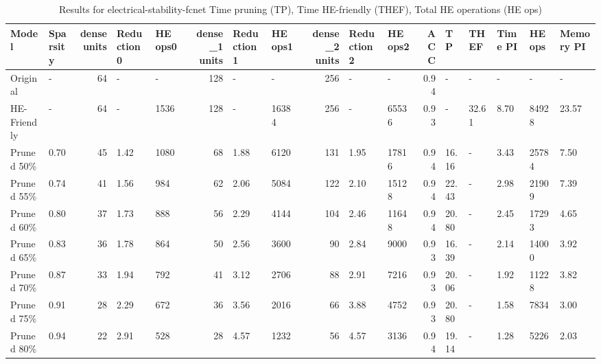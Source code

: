 \begin{table}
\centering
\caption{Results for electrical-stability-fcnet  Time pruning (TP), Time HE-friendly (THEF), Total HE operations (HE ops)}
\begin{tabular}{llrllrllrllrlllll}
\toprule
      Model & Sparsity &  dense units & Reduction0 & HE ops0 &  dense\_1 units & Reduction1 & HE ops1 &  dense\_2 units & Reduction2 & HE ops2 &  ACC &    TP &  THEF & Time PI & HE ops & Memory PI \\
\midrule
   Original &        - &           64 &          - &       - &            128 &          - &       - &            256 &          - &       - & 0.94 &     - &     - &       - &      - &         - \\
HE-Friendly &        - &           64 &          - &    1536 &            128 &          - &   16384 &            256 &          - &   65536 & 0.93 &     - & 32.61 &    8.70 &  84928 &     23.57 \\
 Pruned 50\% &     0.70 &           45 &       1.42 &    1080 &             68 &       1.88 &    6120 &            131 &       1.95 &   17816 & 0.94 & 16.16 &     - &    3.43 &  25784 &      7.50 \\
 Pruned 55\% &     0.74 &           41 &       1.56 &     984 &             62 &       2.06 &    5084 &            122 &       2.10 &   15128 & 0.94 & 22.43 &     - &    2.98 &  21909 &      7.39 \\
 Pruned 60\% &     0.80 &           37 &       1.73 &     888 &             56 &       2.29 &    4144 &            104 &       2.46 &   11648 & 0.94 & 20.80 &     - &    2.45 &  17293 &      4.65 \\
 Pruned 65\% &     0.83 &           36 &       1.78 &     864 &             50 &       2.56 &    3600 &             90 &       2.84 &    9000 & 0.93 & 16.39 &     - &    2.14 &  14000 &      3.92 \\
 Pruned 70\% &     0.87 &           33 &       1.94 &     792 &             41 &       3.12 &    2706 &             88 &       2.91 &    7216 & 0.93 & 20.06 &     - &    1.92 &  11228 &      3.82 \\
 Pruned 75\% &     0.91 &           28 &       2.29 &     672 &             36 &       3.56 &    2016 &             66 &       3.88 &    4752 & 0.93 & 20.80 &     - &    1.58 &   7834 &      3.00 \\
 Pruned 80\% &     0.94 &           22 &       2.91 &     528 &             28 &       4.57 &    1232 &             56 &       4.57 &    3136 & 0.94 & 19.14 &     - &    1.28 &   5226 &      2.03 \\

\end{tabular}
\end{table}
